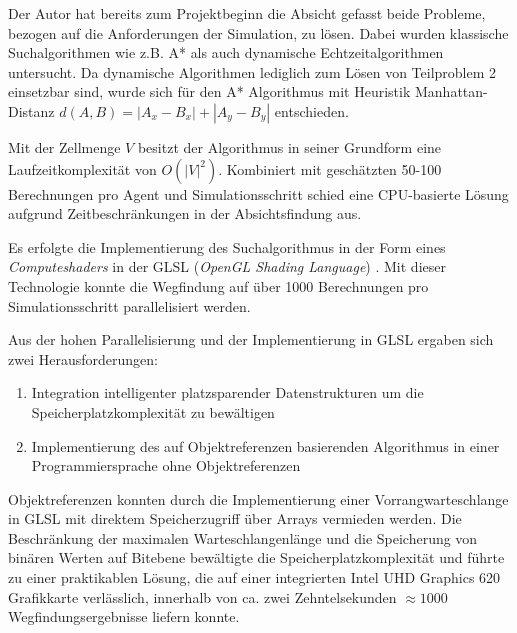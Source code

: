 \documentclass[runningheads]{llncs}
\begin{document}
Der Autor hat bereits zum Projektbeginn die Absicht gefasst beide Probleme, bezogen auf die Anforderungen der Simulation, zu lösen. Dabei wurden klassische Suchalgorithmen wie z.B. A* \cite{Hart1968} als auch dynamische Echtzeitalgorithmen \cite[182-191]{Weiss2000} untersucht. Da dynamische Algorithmen lediglich zum Lösen von Teilproblem 2 einsetzbar sind, wurde sich für den A* Algorithmus mit Heuristik Manhattan-Distanz $d(A, B) = | A_{x} - B_{x} | + | A_{y} - B_{y} |$ entschieden.

Mit der Zellmenge $V$ besitzt der Algorithmus in seiner Grundform eine Laufzeitkomplexität von $O(|V|^{2})$. Kombiniert mit geschätzten 50-100 Berechnungen pro Agent und Simulationsschritt schied eine CPU-basierte Lösung aufgrund Zeitbeschränkungen in der Absichtsfindung aus.

Es erfolgte die Implementierung des Suchalgorithmus in der Form eines \textit{Computeshaders} in der GLSL (\textit{OpenGL Shading Language}) \cite{GLSL}. Mit dieser Technologie konnte die Wegfindung auf über 1000 Berechnungen pro Simulationsschritt parallelisiert werden.

Aus der hohen Parallelisierung und der Implementierung in GLSL ergaben sich zwei Herausforderungen:
\begin{enumerate}
\item Integration intelligenter platzsparender Datenstrukturen um die Speicherplatzkomplexität zu bewältigen
\item Implementierung des auf Objektreferenzen basierenden Algorithmus in einer Programmiersprache ohne Objektreferenzen
\end{enumerate}

Objektreferenzen konnten durch die Implementierung einer Vorrangwarteschlange in GLSL mit direktem Speicherzugriff über Arrays vermieden werden. Die Beschränkung der maximalen Warteschlangenlänge und die Speicherung von binären Werten auf Bitebene bewältigte die Speicherplatzkomplexität und führte zu einer praktikablen Lösung, die auf einer integrierten Intel UHD Graphics 620 Grafikkarte verlässlich, innerhalb von ca. zwei Zehntelsekunden $ \approx 1000$ Wegfindungsergebnisse liefern konnte.
\end{document}

